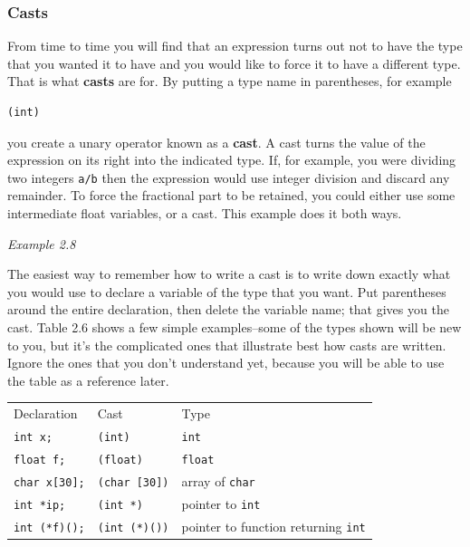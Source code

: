    

   \subsubsection{Casts}
    

    From time to time you will find that an expression turns out not to
     have the type that you wanted it to have and you would like to force it
     to have a different type. That is what \textbf{casts} are for. By
     putting a type name in parentheses, for example


    \begin{Verbatim}
(int)
\end{Verbatim}

    you create a unary operator known as a \textbf{cast}. A cast turns
     the value of the expression on its right into the indicated type. If, for
     example, you were dividing two integers \texttt{a/b} then the
     expression would use integer division and discard any remainder. To force
     the fractional part to be retained, you could either use some
     intermediate float variables, or a cast. This example does it both
     ways.


    \begin{center}\textit{Example 2.8}\end{center}


    The easiest way to remember how to write a cast is to write down
     exactly what you would use to declare a variable of the type that you
     want. Put parentheses around the entire declaration, then delete the
     variable name; that gives you the cast. Table 2.6 shows a
     few simple examples--some of the types shown will be new to you,
     but it's the complicated ones that illustrate best how casts are written.
     Ignore the ones that you don't understand yet, because you will be able
     to use the table as a reference later.


    \begin{tabular}{llp{\textwidth}}
      Declaration & Cast & Type
     \\

      \texttt{int x;} & \texttt{(int)} & \texttt{int}
     \\

      \texttt{float f;} & \texttt{(float)} & \texttt{float}
     \\

      \texttt{char x[30];} & \texttt{(char [30])} & array of \texttt{char}
     \\

      \texttt{int *ip;} & \texttt{(int *)} & pointer to \texttt{int}
     \\

      \texttt{int (*f)();} & \texttt{(int (*)())} & pointer to function returning \texttt{int}
     \\
\end{tabular}

